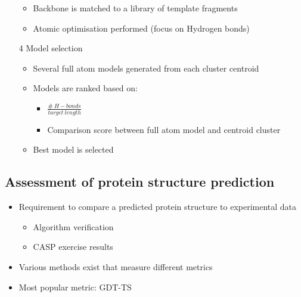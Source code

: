 \documentclass[a4paper]{article}
\begin{document}
\begin{enumerate}
\begin{itemize}
      \item
        Backbone is matched to a library of template fragments

      \item
        Atomic optimisation performed (focus on Hydrogen bonds)
    \end{itemize}

  \item[4]
    Model selection

    \begin{itemize}
      \item
        Several full atom models generated from each cluster centroid

      \item
        Models are ranked based on:

        \begin{itemize}
          \item
            $\frac{\# \: H-bonds}{target \: length}$

          \item
            Comparison score between full atom model and centroid cluster
        \end{itemize}

      \item
        Best model is selected
    \end{itemize}
\end{enumerate}

\subsection{Assessment of protein structure prediction}

\begin{itemize}
  \item
    Requirement to compare a predicted protein structure to experimental data

    \begin{itemize}
      \item Algorithm verification
      \item CASP exercise results
    \end{itemize}

  \item
    Various methods exist that measure different metrics

  \item
    Most popular metric: GDT-TS
\end{itemize}
\end{document}
